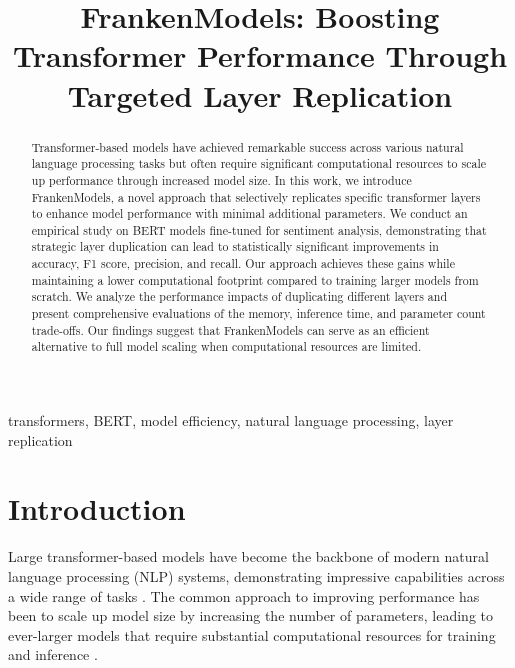 \documentclass[conference]{IEEEtran}
\begin{document}
\title{FrankenModels: Boosting Transformer Performance Through Targeted Layer Replication\\}

\author{
}

\maketitle

\begin{abstract}
Transformer-based models have achieved remarkable success across various natural language processing tasks but often require significant computational resources to scale up performance through increased model size. In this work, we introduce FrankenModels, a novel approach that selectively replicates specific transformer layers to enhance model performance with minimal additional parameters. We conduct an empirical study on BERT models fine-tuned for sentiment analysis, demonstrating that strategic layer duplication can lead to statistically significant improvements in accuracy, F1 score, precision, and recall. Our approach achieves these gains while maintaining a lower computational footprint compared to training larger models from scratch. We analyze the performance impacts of duplicating different layers and present comprehensive evaluations of the memory, inference time, and parameter count trade-offs. Our findings suggest that FrankenModels can serve as an efficient alternative to full model scaling when computational resources are limited.
\end{abstract}

\begin{IEEEkeywords}
transformers, BERT, model efficiency, natural language processing, layer replication
\end{IEEEkeywords}

\section{Introduction}
Large transformer-based models have become the backbone of modern natural language processing (NLP) systems, demonstrating impressive capabilities across a wide range of tasks \cite{vaswani2017attention, devlin2019bert}. The common approach to improving performance has been to scale up model size by increasing the number of parameters, leading to ever-larger models that require substantial computational resources for training and inference \cite{brown2020language}.
\end{document}
